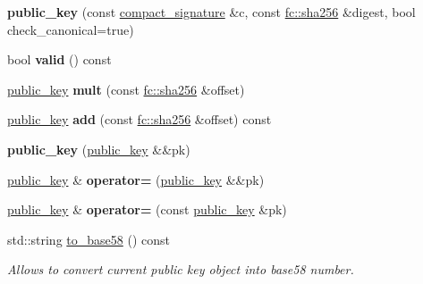 \begin{DoxyCompactItemize}
{\bfseries public\+\_\+key} (const \mbox{\hyperlink{classfc_1_1array}{compact\+\_\+signature}} \&c, const \mbox{\hyperlink{classfc_1_1sha256}{fc\+::sha256}} \&digest, bool check\+\_\+canonical=true)
\item 
\mbox{\label{classfc_1_1crypto_1_1r1_1_1public__key_aab8d388b3e23e80a05cd62e2f3d94da2}} 
bool {\bfseries valid} () const
\item 
\mbox{\label{classfc_1_1crypto_1_1r1_1_1public__key_aeb042d2bf39653ab33c8f91460f96e4f}} 
\mbox{\hyperlink{classfc_1_1crypto_1_1r1_1_1public__key}{public\+\_\+key}} {\bfseries mult} (const \mbox{\hyperlink{classfc_1_1sha256}{fc\+::sha256}} \&offset)
\item 
\mbox{\label{classfc_1_1crypto_1_1r1_1_1public__key_a854601b24237d2723ff9672c1f6f17a7}} 
\mbox{\hyperlink{classfc_1_1crypto_1_1r1_1_1public__key}{public\+\_\+key}} {\bfseries add} (const \mbox{\hyperlink{classfc_1_1sha256}{fc\+::sha256}} \&offset) const
\item 
\mbox{\label{classfc_1_1crypto_1_1r1_1_1public__key_a400ebfdeea2d9d6bae80c0491a041afb}} 
{\bfseries public\+\_\+key} (\mbox{\hyperlink{classfc_1_1crypto_1_1r1_1_1public__key}{public\+\_\+key}} \&\&pk)
\item 
\mbox{\label{classfc_1_1crypto_1_1r1_1_1public__key_a0f44e10a2b5bc0cea474f11c88fcab45}} 
\mbox{\hyperlink{classfc_1_1crypto_1_1r1_1_1public__key}{public\+\_\+key}} \& {\bfseries operator=} (\mbox{\hyperlink{classfc_1_1crypto_1_1r1_1_1public__key}{public\+\_\+key}} \&\&pk)
\item 
\mbox{\label{classfc_1_1crypto_1_1r1_1_1public__key_a294d4a1e83961eb63dfe80064933b553}} 
\mbox{\hyperlink{classfc_1_1crypto_1_1r1_1_1public__key}{public\+\_\+key}} \& {\bfseries operator=} (const \mbox{\hyperlink{classfc_1_1crypto_1_1r1_1_1public__key}{public\+\_\+key}} \&pk)
\item 
\mbox{\label{classfc_1_1crypto_1_1r1_1_1public__key_a731da405da9f3482b49c72db07abdbae}} 
std\+::string \mbox{\hyperlink{classfc_1_1crypto_1_1r1_1_1public__key_a731da405da9f3482b49c72db07abdbae}{to\+\_\+base58}} () const
\begin{DoxyCompactList}\small\item\em Allows to convert current public key object into base58 number. \end{DoxyCompactList}\end{DoxyCompactItemize}
